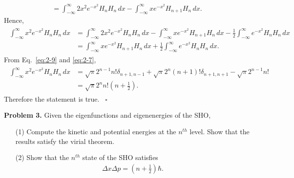 \documentclass[floatfix,nofootinbib,superscriptaddress,fleqn]{revtex4-2}
\begin{document}
\begin{itemize}
\begin{align*}
  =\int_{-\infty}^\infty 2x^2e^{-x^2}H_n H_n \,dx 
  -\int_{-\infty}^\infty xe^{-x^2}H_{n+1}H_n \,dx  .
\end{align*}
Hence, 
\begin{align*}
  \begin{split}
    \int_{-\infty}^\infty x^2e^{-x^2}H_nH_n \,dx  
    &=\int_{-\infty}^\infty 2x^2e^{-x^2}H_n H_n \,dx 
    -\int_{-\infty}^\infty xe^{-x^2}H_{n+1}H_n \,dx 
    -\frac{1}{2}\int_{-\infty}^\infty e^{-x^2}H_nH_n \,dx \\
    &=\int_{-\infty}^\infty xe^{-x^2}H_{n+1}H_n \,dx 
    +\frac{1}{2}\int_{-\infty}^\infty e^{-x^2}H_nH_n \,dx.
  \end{split}
\end{align*}
From Eq.~\eqref{eq:2-9} and \eqref{eq:2-7},
\begin{align}\label{eq:2-10}
  \begin{split}
    \int_{-\infty}^\infty x^2e^{-x^2}H_nH_n \,dx  
    &=\sqrt{\pi}2^{n-1}n!\delta_{n+1,n-1}
    +\sqrt{\pi}2^{n}(n+1)!\delta_{n+1,n+1}
    -\sqrt{\pi}2^{n-1}n!  \\
    &=\sqrt{\pi}2^nn!\left(n+\frac{1}{2}\right).
  \end{split}
\end{align}
Therefore the statement is true. ~\hfill $\square$
\end{itemize}

\vspace{0.5cm}

\noindent \textbf{Problem 3.} 
Given the eigenfunctions and eigenenergies of the SHO, 
\begin{itemize}
\item[(1)] Compute the kinetic and potential energies at the $n^{th}$
  level.  Show that the results satisfy the virial theorem. 
\item[(2)] Show that the $n^{th}$ state of the SHO satisfies 
  \begin{align}
    \Delta x \Delta p = \left(n+\frac12\right)\hbar.
  \end{align}
\end{itemize}
\end{document}

